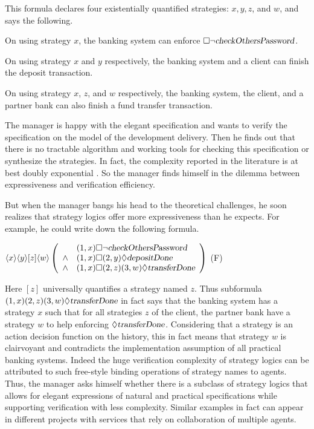 This formula declares four existentially quantified strategies: $x,y,z$, and $w$, and says the following. 

\begin{list1} 
\item On using strategy $x$, the banking system can enforce $\Box\neg \mbox{\sl checkOthersPassword}$.  
\item On using strategy $x$ and $y$ respectively, the banking system and a client can 
  finish the deposit transaction.  
\item On using strategy $x$, $z$, and $w$ respectively, the banking system, the client, and 
  a partner bank can also finish a fund transfer transaction.  
\end{list1} 

The manager is happy with the elegant specification and wants to verify the specification on the model of the development delivery.
Then he finds out that there is no tractable algorithm and working tools for checking this specification or synthesize the strategies.
In fact, the complexity reported in the literature is at best doubly exponential \cite{CHP10,MMV10}. 
So the manager finds himself in the dilemma between expressiveness and verification efficiency.  

But when the manager bangs his head to the theoretical challenges, he soon realizes that strategy logics offer more expressiveness than he expects.
For example, he could write down the following formula.
\begin{center} 
\hfill 
$\langle x\rangle \langle y\rangle[ z] \langle w\rangle \left(\begin{array}{cl}
		& (1,x)\Box\neg \mbox{\sl checkOthersPassword}\\
\wedge 	& (1,x)\Box (2,y)\Diamond \mbox{\sl depositDone} \\
\wedge  & (1,x)\Box (2,z)(3,w)\Diamond\mbox{\sl transferDone} 
\end{array}\right)$
\hfill (F) 
\end{center}  
Here $[z]$ universally quantifies a strategy named $z$.  
Thus subformula $(1,x)(2,z)(3,w)\Diamond\mbox{\sl transferDone}$ in fact says that the banking system has a strategy $x$ such that for all strategies $z$ of the client, the partner bank have a strategy $w$ to help enforcing $\Diamond\mbox{\sl transferDone}$.
Considering that a strategy is an action decision function on the history, this in fact means that strategy $w$ is clairvoyant and contradicts the implementation assumption of all practical banking systems.  
Indeed the huge verification complexity of strategy logics can be attributed to such free-style binding operations of strategy names to agents.  
Thus, the manager asks himself whether there is a subclass of strategy logics that allows for elegant expressions of natural and practical specifications while supporting verification with less complexity.
Similar examples in fact can appear in different projects with services that rely on collaboration of multiple agents.


